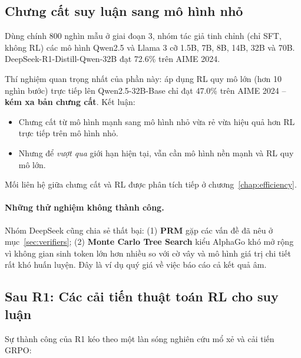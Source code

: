 \subsection{Chưng cất suy luận sang mô hình nhỏ}
\label{ssec:r1_distill}
Dùng chính 800 nghìn mẫu ở giai đoạn 3, nhóm tác giả tinh chỉnh (chỉ SFT, không RL) các mô hình Qwen2.5 và Llama 3 cỡ 1.5B, 7B, 8B, 14B, 32B và 70B. DeepSeek-R1-Distill-Qwen-32B đạt 72.6\% trên AIME 2024.

Thí nghiệm quan trọng nhất của phần này: áp dụng RL quy mô lớn (hơn 10 nghìn bước) trực tiếp lên Qwen2.5-32B-Base chỉ đạt 47.0\% trên AIME 2024 -- \textbf{kém xa bản chưng cất}. Kết luận:
\begin{itemize}
	\item Chưng cất từ mô hình mạnh sang mô hình nhỏ vừa rẻ vừa hiệu quả hơn RL trực tiếp trên mô hình nhỏ.
	\item Nhưng để \emph{vượt qua} giới hạn hiện tại, vẫn cần mô hình nền mạnh và RL quy mô lớn.
\end{itemize}
Mối liên hệ giữa chưng cất và RL được phân tích tiếp ở chương~\ref{chap:efficiency}.

\paragraph{Những thử nghiệm không thành công.} Nhóm DeepSeek cũng chia sẻ thất bại: (1) \textbf{PRM} gặp các vấn đề đã nêu ở mục~\ref{sec:verifiers}; (2) \textbf{Monte Carlo Tree Search} kiểu AlphaGo khó mở rộng vì không gian sinh token lớn hơn nhiều so với cờ vây và mô hình giá trị chi tiết rất khó huấn luyện. Đây là ví dụ quý giá về việc báo cáo cả kết quả âm.

\subsection{Sau R1: Các cải tiến thuật toán RL cho suy luận}
\label{ssec:grpo_variants}
Sự thành công của R1 kéo theo một làn sóng nghiên cứu mổ xẻ và cải tiến GRPO:

